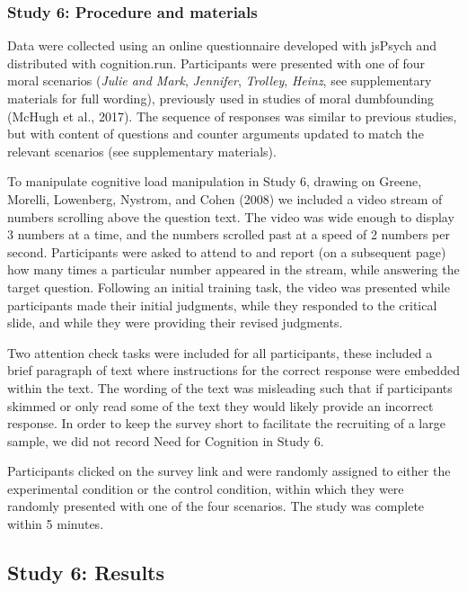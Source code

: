 \documentclass[
  american,
  man]{apa7}
\begin{document}
\hypertarget{study-6-procedure-and-materials}{%
\subsubsection{Study 6: Procedure and materials}\label{study-6-procedure-and-materials}}

Data were collected using an online questionnaire developed with jsPsych and distributed with cognition.run. Participants were presented with one of four moral scenarios (\emph{Julie and Mark}, \emph{Jennifer}, \emph{Trolley}, \emph{Heinz}, see supplementary materials for full wording), previously used in studies of moral dumbfounding (McHugh et al., 2017). The sequence of responses was similar to previous studies, but with content of questions and counter arguments updated to match the relevant scenarios (see supplementary materials).

To manipulate cognitive load manipulation in Study 6, drawing on Greene, Morelli, Lowenberg, Nystrom, and Cohen (2008) we included a video stream of numbers scrolling above the question text. The video was wide enough to display 3 numbers at a time, and the numbers scrolled past at a speed of 2 numbers per second. Participants were asked to attend to and report (on a subsequent page) how many times a particular number appeared in the stream, while answering the target question. Following an initial training task, the video was presented while participants made their initial judgments, while they responded to the critical slide, and while they were providing their revised judgments.

Two attention check tasks were included for all participants, these included a brief paragraph of text where instructions for the correct response were embedded within the text. The wording of the text was misleading such that if participants skimmed or only read some of the text they would likely provide an incorrect response. In order to keep the survey short to facilitate the recruiting of a large sample, we did not record Need for Cognition in Study 6.

Participants clicked on the survey link and were randomly assigned to either the experimental condition or the control condition, within which they were randomly presented with one of the four scenarios. The study was complete within 5 minutes.

\hypertarget{study-6-results}{%
\subsection{Study 6: Results}\label{study-6-results}}
\end{document}
